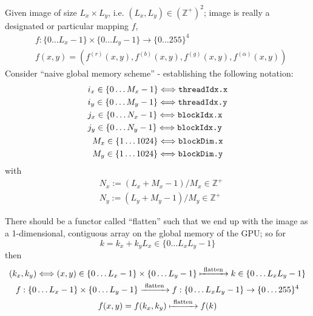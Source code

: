 \documentclass[10pt]{amsart}
\begin{document}
\begin{multicols*}{2}
Given image of size $L_x \times L_y$, i.e. $(L_x,L_y) \in (\mathbb{Z}^+)^2$; image is really a designated or particular mapping $f$,
\[
\begin{aligned}
  & f: \lbrace 0 \dots L_x - 1 \rbrace \times \lbrace 0 \dots L_y - 1 \rbrace \to \lbrace 0 \dots 255 \rbrace^4 \\ 
  & f(x,y) = (f^{(r)}(x,y) , f^{(b)}(x,y), f^{(g)}(x,y), f^{(\alpha)}(x,y) )
\end{aligned}
\]
Consider ``naive global memory scheme'' - establishing the following notation:
\[
\begin{gathered}
  \begin{aligned}
    & i_x \in \lbrace 0 \dots M_x - 1 \rbrace \Longleftrightarrow \verb|threadIdx.x| \\
    & i_y \in \lbrace 0 \dots M_y - 1 \rbrace \Longleftrightarrow \verb|threadIdx.y|  \\
    & j_x \in \lbrace 0 \dots N_x - 1 \rbrace \Longleftrightarrow \verb|blockIdx.x|  \\
    & j_y \in \lbrace 0 \dots N_y - 1 \rbrace \Longleftrightarrow \verb|blockIdx.y|  
  \end{aligned} \\
  \begin{aligned}
    & M_x \in \lbrace 1 \dots 1024 \rbrace \Longleftrightarrow \verb|blockDim.x| \\ 
    & M_y \in \lbrace 1 \dots 1024 \rbrace \Longleftrightarrow \verb|blockDim.y| 
    \end{aligned}
\end{gathered}
\]
with
\[
\begin{aligned}
  & N_x := (L_x + M_x - 1)/M_x \in \mathbb{Z}^+ \\ 
  & N_y := (L_y + M_y - 1)/M_y \in \mathbb{Z}^+ 
  \end{aligned}
\]

There should be a functor called ``flatten'' such that we end up with the image as a 1-dimensional, contiguous array on the global memory of the GPU; so for
\[
k = k_x + k_y L_x \in \lbrace 0 \dots L_x L_y - 1 \rbrace
\]
then
\[
\begin{gathered}
  (k_x,k_y) \Longleftrightarrow (x,y) \in \lbrace 0 \dots L_x -1 \rbrace \times \lbrace 0 \dots L_y - 1 \rbrace \xmapsto{ \text{ flatten }} k \in \lbrace 0 \dots L_xL_y -1 \rbrace \\
  f:\lbrace 0 \dots L_x -1 \rbrace \times \lbrace 0 \dots L_y - 1 \rbrace \xrightarrow{ \text{ flatten }} f: \lbrace 0 \dots L_x L_y - 1 \rbrace \to \lbrace 0 \dots 255 \rbrace^4  \\
  f(x,y) = f(k_x,k_y) \xmapsto{ \text{ flatten } } f(k) 
\end{gathered}
\]


\end{multicols*}
\end{document}
